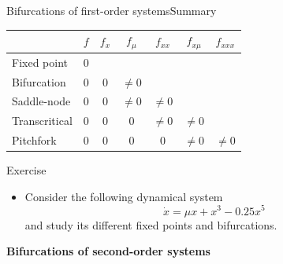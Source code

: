 \documentclass[usenames,dvipsnames,svgnames,10pt,aspectratio=169]{beamer}
\begin{document}
\begin{frame}[t, c]{Bifurcations of first-order systems}{Summary}
	\centering
	\begin{tabular}{l|cccccc}
		~ & $f$ & $f_x$ & $f_{\mu}$ & $f_{xx}$ & $f_{x \mu}$ & $f_{xxx}$ \\
		\hline
		Fixed point & $0$ \\
		Bifurcation  & $0$ & $0$ & $\neq 0$ \\
		Saddle-node & $0$ & $0$ & $\neq 0$ & $\neq 0$\\
		Transcritical & $0$ & $0$ & $0$ & $\neq 0$ & $\neq 0$\\
		Pitchfork & $0$ & $0$ & $0$ & $0$ & $\neq 0$ & $\neq 0$\\
	\end{tabular}

	\vspace{1cm}
\end{frame}

\begin{frame}[t, c]{Exercise}
	\begin{itemize}
		\item Consider the following dynamical system
		$$\dot{x} = \mu x + x^3 - 0.25 x^5$$
		and study its different fixed points and bifurcations.
	\end{itemize}

	\vspace{1cm}
\end{frame}

\begin{frame}[t, c]{}
	\centering
	\vspace{1cm}

	{\Large \textbf{Bifurcations of second-order systems}}

	\bigskip

	{}

\end{frame}
\end{document}
